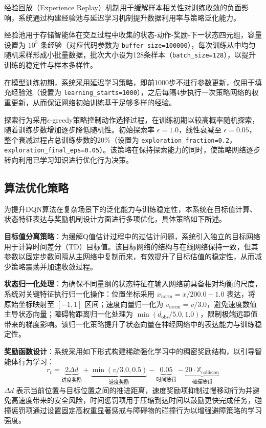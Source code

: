 经验回放（Experience Replay）机制用于缓解样本相关性对训练收敛的负面影响，系统通过构建经验池与延迟学习机制提升数据利用率与策略泛化能力。

经验池用于存储智能体在交互过程中收集的状态-动作-奖励-下一状态四元组，容量设置为 $10^5$ 条经验（对应代码参数为 \texttt{buffer\_size=100000}），每次训练从中均匀随机采样形成小批量数据，批次大小设为128条样本（\texttt{batch\_size=128}），以提升训练的稳定性与样本多样性。

在模型训练初期，系统采用延迟学习策略，即前1000步不进行参数更新，仅用于填充经验池（设置为 \texttt{learning\_starts=1000}），之后每隔4步执行一次策略网络的权重更新，从而保证网络初始训练基于足够多样的经验。

探索行为采用$\epsilon$-greedy策略控制动作选择过程，在训练初期以较高概率随机探索，随着训练步数增加逐步降低随机性。初始探索率 $\epsilon=1.0$，线性衰减至 $\epsilon=0.05$，整个衰减过程占总训练步数的20\%（设置为 \texttt{exploration\_fraction=0.2}，\texttt{exploration\_final\_eps=0.05}）。该策略在保持探索能力的同时，使策略网络逐步转向利用已学习知识进行优化行为决策。

\subsection{算法优化策略}

为提升DQN算法在复杂场景下的泛化能力与训练稳定性，本系统在目标值计算、状态特征表达与奖励机制设计方面进行多项优化，具体策略如下所述。

\textbf{目标值分离策略}：为缓解Q值估计过程中的过估计问题，系统引入独立的目标网络用于计算时间差分（TD）目标值。该目标网络的结构与在线网络保持一致，但其参数以固定步数间隔从主网络中复制而来，有效提升了目标估值的稳定性，从而减少策略震荡并加速收敛过程。

\textbf{状态归一化处理}：为确保不同量纲的状态特征在输入网络前具备相对均衡的尺度，系统对关键特征执行归一化操作：位置坐标采用 $x_{\text{norm}} = x/200.0 - 1.0$ 表达，将原始坐标映射至 $[-1, 1]$ 区间；速度向量归一化为 $v_{\text{norm}} = v/3.0$，避免速度数值主导状态向量；障碍物距离归一化处理为 $\min(d_{\text{obs}}/5.0, 1.0)$，限制极端远距值带来的梯度影响。该归一化策略提升了状态向量在神经网络中的表达能力与训练稳定性。

\textbf{奖励函数设计}：系统采用如下形式构建稀疏强化学习中的稠密奖励结构，以引导智能体行为学习：
\[
r_t = \underbrace{2\Delta d}_{\text{进度奖励}} + \underbrace{\min(v/3.0, 0.5)}_{\text{速度奖励}} - \underbrace{0.05}_{\text{时间惩罚}} - \underbrace{20\cdot\mathbb{X}_{\text{collision}}}_{\text{碰撞惩罚}}
\]
$\Delta d$ 表示当前位置与目标位置之间的推进距离，速度奖励项抑制过慢移动行为并避免高速度带来的安全风险，时间惩罚项用于压缩到达时间以鼓励更快完成任务，碰撞惩罚项通过设置固定高权重显著惩戒与障碍物的碰撞行为以增强避障策略的学习强度。

